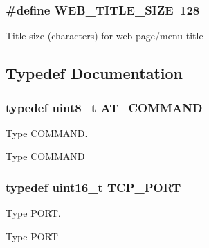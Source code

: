 \subsubsection[{\texorpdfstring{W\+E\+B\+\_\+\+T\+I\+T\+L\+E\+\_\+\+S\+I\+ZE}{WEB_TITLE_SIZE}}]{\setlength{\rightskip}{0pt plus 5cm}\#define W\+E\+B\+\_\+\+T\+I\+T\+L\+E\+\_\+\+S\+I\+ZE~128}\hypertarget{group__wireless__interface_gaa4b9b2c3a0037685aa27d2cf3201dc4d}{}\label{group__wireless__interface_gaa4b9b2c3a0037685aa27d2cf3201dc4d}
Title size (characters) for web-\/page/menu-\/title 

\subsection{Typedef Documentation}
\subsubsection[{\texorpdfstring{A\+T\+\_\+\+C\+O\+M\+M\+A\+ND}{AT_COMMAND}}]{\setlength{\rightskip}{0pt plus 5cm}typedef uint8\+\_\+t {\bf A\+T\+\_\+\+C\+O\+M\+M\+A\+ND}}\hypertarget{group__wireless__interface_ga4086b0cc4b349f6204256017ac437d3f}{}\label{group__wireless__interface_ga4086b0cc4b349f6204256017ac437d3f}


Type C\+O\+M\+M\+A\+ND. 

Type C\+O\+M\+M\+A\+ND 
\subsubsection[{\texorpdfstring{T\+C\+P\+\_\+\+P\+O\+RT}{TCP_PORT}}]{\setlength{\rightskip}{0pt plus 5cm}typedef uint16\+\_\+t {\bf T\+C\+P\+\_\+\+P\+O\+RT}}\hypertarget{group__wireless__interface_ga6be486e56223df1b41c1f3a04cb7d471}{}\label{group__wireless__interface_ga6be486e56223df1b41c1f3a04cb7d471}


Type P\+O\+RT. 

Type P\+O\+RT 
